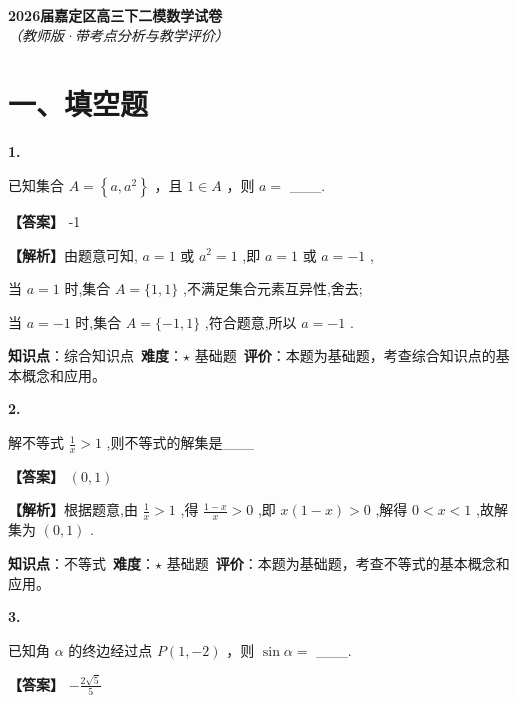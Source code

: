 \documentclass[10pt]{article}
\newenvironment{questionblock}[1]{%
  \needspace{3\baselineskip}%
  \noindent\textbf{#1.}%
}{%
  \par\vspace{1em}%
}
\begin{document}
\begin{center}
\Large\textbf{2026届嘉定区高三下二模数学试卷}\\[0.5em]
\normalsize\textit{（教师版·带考点分析与教学评价）}
\end{center}

\section*{一、填空题}

\begin{questionblock}{1}
已知集合 \(A = \left\{  {a,{a}^{2}}\right\}\) ，且 \(1 \in  A\) ，则 \(a =\) ___.
\end{questionblock}

\textbf{【答案】} -1

\textbf{【解析】}由题意可知, \(a = 1\) 或 \({a}^{2} = 1\) ,即 \(a = 1\) 或 \(a =  - 1\) ,

当 \(a = 1\) 时,集合 \(A = \{ 1,1\}\) ,不满足集合元素互异性,舍去;

当 \(a =  - 1\) 时,集合 \(A = \{  - 1,1\}\) ,符合题意,所以 \(a =  - 1\) .

\begin{analysisbox}[考点分析]
\textbf{知识点}：综合知识点\
\textbf{难度}：$\star$ 基础题\
\textbf{评价}：本题为基础题，考查综合知识点的基本概念和应用。
\end{analysisbox}

\begin{questionblock}{2}
解不等式 \(\frac{1}{x} > 1\) ,则不等式的解集是___
\end{questionblock}

\textbf{【答案】} \(\left( {0,1}\right)\)

\textbf{【解析】}根据题意,由 \(\frac{1}{x} > 1\) ,得 \(\frac{1 - x}{x} > 0\) ,即 \(x\left( {1 - x}\right)  > 0\) ,解得 \(0 < x < 1\) ,故解集为 \(\left( {0,1}\right)\) .

\begin{analysisbox}[考点分析]
\textbf{知识点}：不等式\
\textbf{难度}：$\star$ 基础题\
\textbf{评价}：本题为基础题，考查不等式的基本概念和应用。
\end{analysisbox}

\begin{questionblock}{3}
已知角 \(\alpha\) 的终边经过点 \(P\left( {1, - 2}\right)\) ，则 \(\sin \alpha  =\) ___.
\end{questionblock}

\textbf{【答案】} \(- \frac{2\sqrt{5}}{5}\)
\end{document}
